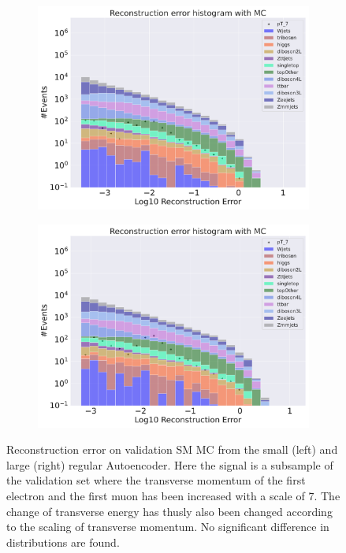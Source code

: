 \begin{figure}[H]
    \centering
    \begin{subfigure}{.45\textwidth}
        \includegraphics[width=\textwidth]{Figures/AE_testing/small/b_data_recon_big_rm3_feats_sig_pT_7.pdf}
        \caption{ }
        \label{fig:ae_small_pt_7}
    \end{subfigure}
    \hfill 
    \begin{subfigure}{.45\textwidth}
        \includegraphics[width=\textwidth]{Figures/AE_testing/big/b_data_recon_big_rm3_feats_sig_pT_7.pdf}
        \caption{ }
        \label{fig:ae_big_pt_7}
    \end{subfigure}
    \hfill 
    \caption[AE | Reconstruction error $p_T$ altering of 7]{Reconstruction error on validation SM MC from the small (left) and large (right) regular Autoencoder. Here the signal is a subsample of the validation 
    set where the transverse momentum of the first electron and the first muon has been increased with a scale of $7$. The change of transverse 
    energy has thusly also been changed according to the scaling of transverse momentum. No significant difference in distributions are found. }
    \label{fig:ae_big_small_pt_7}
\end{figure}

